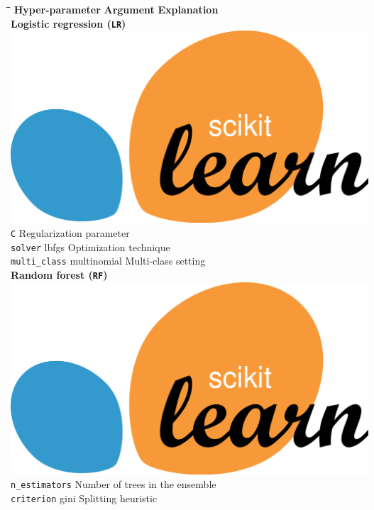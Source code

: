 \begin{tabbing}
	\hspace*{1cm}\=\hspace*{4cm}\=\hspace*{6cm}\=\kill
		\>	\textbf{Hyper-parameter}
		\>	\textbf{Argument}
		\>	\textbf{Explanation} 	\\[4mm]
	 \textbf{Logistic regression (\texttt{LR})} 
		\>	\>	\> 	\includegraphics[scale=0.02]{images/sklearn}									\\[3mm]
		\>	\texttt{C}								\>	Regularization parameter			\\[3mm]
		\> 	\texttt{solver}		\>	lbfgs					\>	Optimization technique			\\[3mm]
		\>	\texttt{multi\_class}	\>	multinomial				\>	Multi-class setting					\\[4mm]
	 \textbf{Random forest (\texttt{RF})}
		\>	\>	\> 	\includegraphics[scale=0.02]{images/sklearn}									\\[3mm]
		\>	\texttt{n\_estimators}							\>	Number of trees in the ensemble	\\[3mm]
		\>	\texttt{criterion} 		\>	gini						\>	Splitting heuristic					\\[3mm]

\end{tabbing}
